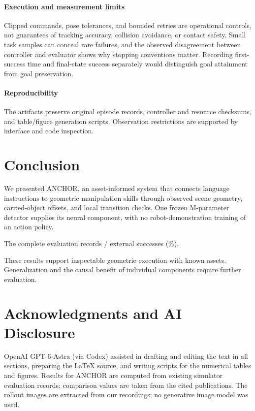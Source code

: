 \documentclass[letterpaper,10pt,conference]{ieeeconf}
\newcommand{\method}{ANCHOR}
\begin{document}
\paragraph{Execution and measurement limits}
Clipped commands, pose tolerances, and bounded retries are operational
controls, not guarantees of tracking accuracy, collision avoidance, or
contact safety. Small task samples can conceal rare failures, and the
observed disagreement between controller and evaluator shows why stopping
conventions matter. Recording first-success time and final-state success
separately would distinguish goal attainment from goal preservation.

\paragraph{Reproducibility}
The artifacts preserve original episode records, controller and resource
checksums, and table/figure generation scripts. Observation restrictions
are supported by interface and code inspection.

\section{Conclusion}
We presented \method{}, an asset-informed system that connects language
instructions to geometric manipulation skills through observed scene
geometry, carried-object offsets, and local transition checks. One frozen
\NeuralMillion{}M-parameter detector supplies its neural component, with
no robot-demonstration training of an action policy.

The complete evaluation records \SuccessCount/\EpisodeCount{} external
successes (\SuccessRate{}\%).

These results support inspectable geometric execution with known assets.
Generalization and the causal benefit of individual components require
further evaluation.

\section*{Acknowledgments and AI Disclosure}
OpenAI GPT-6-Astra (via Codex) assisted in drafting and editing the text in all sections,
preparing the LaTeX source, and writing scripts for the numerical tables and
figures. Results for \method{} are computed from existing simulator evaluation
records; comparison values are taken from the cited publications.
The rollout images are extracted from our recordings; no
generative image model was used.



\end{document}
